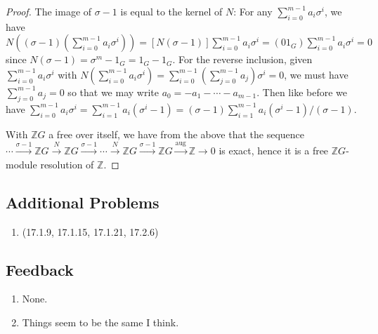 \documentclass[11pt]{article}
\DeclareMathOperator{\aug}{aug}
\begin{document}
\begin{enumerate}
\begin{enumerate}
\begin{proof}
            The image of $\sigma-1$ is equal to the kernel of $N$: For any $\sum_{i=0}^{m-1}a_i\sigma^i$, we have $N((\sigma-1)(\sum_{i=0}^{m-1}a_i\sigma^i)) = [N(\sigma-1)]\sum_{i=0}^{m-1}a_i\sigma^i = (01_G)\sum_{i=0}^{m-1}a_i\sigma^i = 0$ since $N(\sigma-1) = \sigma^m-1_G = 1_G - 1_G$. For the reverse inclusion, given $\sum_{i=0}^{m-1}a_i\sigma^i$ with $N(\sum_{i=0}^{m-1}a_i\sigma^i) = \sum_{i=0}^{m-1}(\sum_{j=0}^{m-1}a_j)\sigma^i = 0$, we must have $\sum_{j=0}^{m-1}a_j = 0$ so that we may write $a_0 = -a_1-\cdots-a_{m-1}$. Then like before we have $\sum_{i=0}^{m-1}a_i\sigma^i = \sum_{i=1}^{m-1}a_i(\sigma^i-1) = (\sigma-1)\sum_{i=1}^{m-1}a_i(\sigma^i-1)/(\sigma-1)$.

            With $\mathbb{Z}G$ a free over itself, we have from the above that the sequence $\cdots\xrightarrow{\sigma-1}\mathbb{Z}G\xrightarrow{N}\mathbb{Z}G\xrightarrow{\sigma-1}\cdots\xrightarrow{N}\mathbb{Z}G\xrightarrow{\sigma-1}\mathbb{Z}G\xrightarrow{\aug}\mathbb{Z}\to 0$ is exact, hence it is a free $\mathbb{Z}G$-module resolution of $\mathbb{Z}$.
        \end{proof}
    \end{enumerate}
\end{enumerate}
\subsection*{Additional Problems}
\begin{enumerate}
    \item (17.1.9, 17.1.15, 17.1.21, 17.2.6)
\end{enumerate}
\subsection*{Feedback}
\begin{enumerate}
    \item None.
    \item Things seem to be the same I think.
\end{enumerate}
\end{document}

